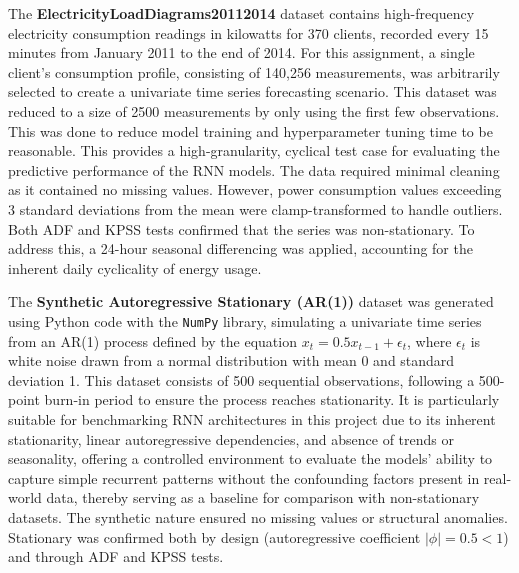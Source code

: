 \documentclass[conference, 10pt]{IEEEtran}
\begin{document}
The \textbf{ElectricityLoadDiagrams20112014} dataset contains high-frequency electricity consumption readings in
kilowatts for 370 clients, recorded every 15 minutes from January 2011 to the end of 2014. For this assignment, a single
client's consumption profile, consisting of 140,256 measurements, was arbitrarily selected to create a univariate
time series forecasting scenario. This dataset was reduced to a size of 2500 measurements by only using the first few
observations. This was done to reduce model training and hyperparameter tuning time to be reasonable. This provides a
high-granularity, cyclical test case for evaluating the predictive performance of the RNN models. The data required
minimal cleaning as it contained no missing values. However, power consumption values exceeding 3 standard deviations
from the mean were clamp-transformed to handle outliers. Both ADF and KPSS tests confirmed that the series was
non-stationary. To address this, a 24-hour seasonal differencing was applied, accounting for the inherent daily
cyclicality of energy usage.

The \textbf{Synthetic Autoregressive Stationary (AR(1))} dataset was generated using Python code with the \texttt{NumPy}
library, simulating a univariate time series from an AR(1) process defined by the equation $x_t = 0.5 x_{t-1} +
\epsilon_t$, where $\epsilon_t$ is white noise drawn from a normal distribution with mean 0 and standard deviation 1.
This dataset consists of 500 sequential observations, following a 500-point burn-in period to ensure the process reaches
stationarity. It is particularly suitable for benchmarking RNN architectures in this project due to its inherent
stationarity, linear autoregressive dependencies, and absence of trends or seasonality, offering a controlled
environment to evaluate the models' ability to capture simple recurrent patterns without the confounding factors present
in real-world data, thereby serving as a baseline for comparison with non-stationary datasets. The synthetic nature
ensured no missing values or structural anomalies. Stationary was confirmed both by design (autoregressive coefficient
$|\phi| = 0.5 < 1$) and through ADF and KPSS tests.
\end{document}
